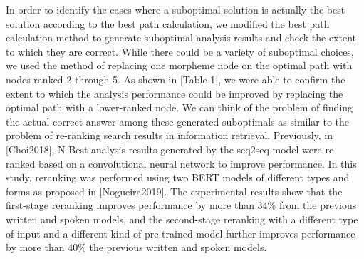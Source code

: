 \documentclass[AMS,STIX2COL]{WileyNJD-v2}
\begin{document}

    In order to identify the cases where a suboptimal solution is actually the best solution according to the best path calculation, we modified the best path calculation method to generate suboptimal analysis results and check the extent to which they are correct.
    While there could be a variety of suboptimal choices, we used the method of replacing one morpheme node on the optimal path with nodes ranked 2 through 5.
    As shown in [Table 1], we were able to confirm the extent to which the analysis performance could be improved by replacing the optimal path with a lower-ranked node.
    We can think of the problem of finding the actual correct answer among these generated suboptimals as similar to the problem of re-ranking search results in information retrieval.
    Previously, in [Choi2018], N-Best analysis results generated by the seq2seq model were re-ranked based on a convolutional neural network to improve performance.
    In this study, reranking was performed using two BERT models of different types and forms as proposed in [Nogueira2019].
    The experimental results show that the first-stage reranking improves performance by more than 34\% from the previous written and spoken models, and the second-stage reranking with a different type of input and a different kind of pre-trained model further improves performance by more than 40\% the previous written and spoken models.
\end{document}
